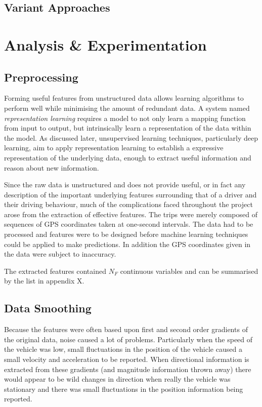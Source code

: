 \documentclass[a4paper, 11pt, twocolumn]{report}
\begin{document}
\subsection{Variant Approaches}






\section{Analysis \& Experimentation}

\subsection{Preprocessing}

Forming useful features from unstructured data allows learning algorithms to perform well while minimising the amount of redundant data. A system named \textit{representation learning} requires a model to not only learn a mapping function from input to output, but intrinsically learn a representation of the data within the model. As discussed later, unsupervised learning techniques, particularly deep learning, aim to apply representation learning to establish a expressive representation of the underlying data, enough to extract useful information and reason about new information.

Since the raw data is unstructured and does not provide useful, or in fact any description of the important underlying features surrounding that of a driver and their driving behaviour, much of the complications faced throughout the project arose from the extraction of effective features. The trips were merely composed of sequences of GPS coordinates taken at one-second intervals. The data had to be processed and features were to be designed before machine learning techniques could be applied to make predictions. In addition the GPS coordinates given in the data were subject to inaccuracy. 

The extracted features contained $N_F$ continuous variables and can be summarised by the list in appendix X.


\subsection{Data Smoothing}
Because the features were often based upon first and second order gradients of the original data, noise caused a lot of problems. Particularly when the speed of the vehicle was low, small fluctuations in the position of the vehicle caused a small velocity and acceleration to be reported. When directional information is extracted from these gradients (and magnitude information thrown away) there would appear to be wild changes in direction when really the vehicle was stationary and there was small fluctuations in the position information being reported. 
\end{document}
